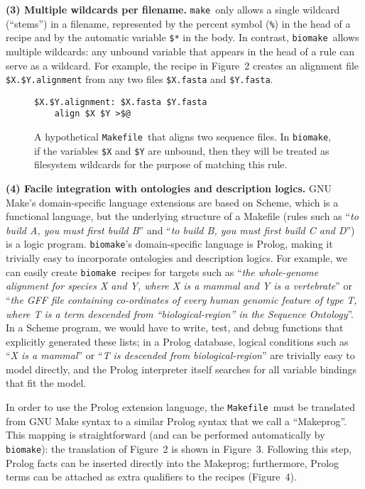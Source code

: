 \documentclass{bioinfo}
\newcommand\make{{\tt make}}
\newcommand\Makefile{{\tt Makefile}}
\newcommand\biomake{{\tt biomake}}
\begin{document}
{\bf (3) Multiple wildcards per filename.}
\make\ only allows a single wildcard (``stems'') in a filename,
represented by the percent symbol ({\tt \%}) in the head of a recipe and by the automatic variable {\tt \$*} in the body.
In contrast, \biomake\ allows multiple wildcards: any unbound variable that appears in the head of a rule can serve as a wildcard.
For example, the recipe in Figure~2 creates an alignment file {\tt \$X.\$Y.alignment} from any two files {\tt \$X.fasta} and {\tt \$Y.fasta}.

\begin{figure}
\begin{Verbatim}[frame=single]
$X.$Y.alignment: $X.fasta $Y.fasta
    align $X $Y >$@
\end{Verbatim}
\caption{
  A hypothetical \Makefile\ that aligns two sequence files.
  In \biomake, if the variables {\tt \$X} and {\tt \$Y} are unbound, then they will be treated as filesystem wildcards
  for the purpose of matching this rule.
}
\end{figure}

{\bf (4) Facile integration with ontologies and description logics.}
GNU Make's domain-specific language extensions are based on Scheme, which is a functional language,
but the underlying structure of a Makefile (rules such as ``{\em to build A, you must first build B}'' and ``{\em to build B, you must first build C and D}'')
is a logic program.
\biomake's domain-specific language is Prolog, making it trivially easy to incorporate ontologies and description logics.
For example, we can easily create \biomake\ recipes for targets such as ``{\em the whole-genome alignment for species X and Y, where X is a mammal and Y is a vertebrate}''
or ``{\em the GFF file containing co-ordinates of every human genomic feature of type T, where T is a term descended from ``biological-region'' in the Sequence Ontology}''.
In a Scheme program, we would have to write, test, and debug functions that explicitly generated these lists;
in a Prolog database, logical conditions such as ``{\em X is a mammal}'' or ``{\em T is descended from biological-region}'' are trivially easy to model directly,
and the Prolog interpreter itself searches for all variable bindings that fit the model.

In order to use the Prolog extension language, the \Makefile\ must be translated from GNU Make syntax to a similar Prolog syntax that we call a ``Makeprog''.
This mapping is straightforward (and can be performed automatically by \biomake): the translation of Figure~2 is shown in Figure~3.
Following this step, Prolog facts can be inserted directly into the Makeprog; furthermore, Prolog terms can be attached as extra qualifiers to the recipes (Figure~4).
\end{document}
